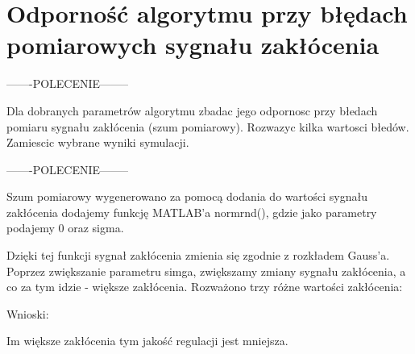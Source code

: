 \section{Odporność algorytmu przy błędach pomiarowych sygnału zakłócenia}

-------POLECENIE--------

Dla dobranych parametrów algorytmu zbadac jego odpornosc przy błedach pomiaru
sygnału zakłócenia (szum pomiarowy). Rozwazyc kilka wartosci błedów. Zamiescic
wybrane wyniki symulacji.

-------POLECENIE--------

Szum pomiarowy wygenerowano za pomocą dodania do wartości sygnału zakłócenia
dodajemy funkcję MATLAB’a normrnd(), 
gdzie jako parametry podajemy 0 oraz sigma.

Dzięki tej funkcji sygnał zakłócenia zmienia się zgodnie z rozkładem Gauss’a.
Poprzez zwiększanie parametru simga, zwiększamy zmiany sygnału zakłócenia, 
a co za tym idzie - większe zakłócenia. 
Rozważono trzy różne wartości zakłócenia:

Wnioski: 

Im większe zakłócenia tym jakość regulacji jest mniejsza.
